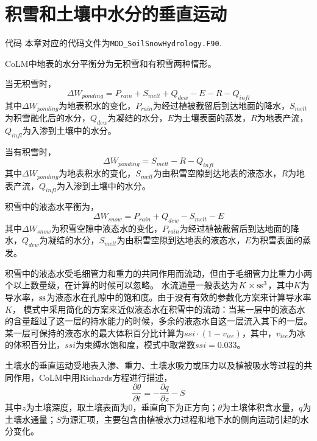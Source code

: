 \chapter{积雪和土壤中水分的垂直运动}\label{积雪和土壤中水分的垂直运动}

\begin{mymdframed}{代码}
本章对应的代码文件为\texttt{MOD\_SoilSnowHydrology.F90}.
\end{mymdframed}

CoLM中地表的水分平衡分为无积雪和有积雪两种情形。

当无积雪时，
\begin{equation}
\Delta W_{ponding} = P_{rain}+S_{melt}+Q_{dew}-E-R-Q_{infl}
\end{equation}
其中$\Delta W_{ponding}$为地表积水的变化，$P_{rain}$为经过植被截留后到达地面的降水，$S_{melt}$为积雪融化后的水分，$Q_{dew}$为凝结的水分，$E$为土壤表面的蒸发，$R$为地表产流，$Q_{infl}$为入渗到土壤中的水分。

当有积雪时，
\begin{equation}
\Delta W_{ponding} = S_{melt}-R-Q_{infl}
\end{equation}
其中$\Delta W_{ponding}$为地表积水的变化，$S_{melt}$为由积雪空隙到达地表的液态水，$R$为地表产流，$Q_{infl}$为入渗到土壤中的水分。

积雪中的液态水平衡为，
\begin{equation}
\Delta W_{snow} = P_{rain}+Q_{dew}-S_{melt}-E
\end{equation}
其中$\Delta W_{snow}$为积雪空隙中液态水的变化，$P_{rain}$为经过植被截留后到达地面的降水，$Q_{dew}$为凝结的水分，$S_{melt}$为由积雪空隙到达地表的液态水，$E$为积雪表面的蒸发。

积雪中的液态水受毛细管力和重力的共同作用而流动，但由于毛细管力比重力小两个以上数量级，在计算的时候可以忽略。
水流通量一般表达为$K\times{\rm ss}^3$，其中$K$为导水率，${\rm ss}$为液态水在孔隙中的饱和度。由于没有有效的参数化方案来计算导水率$K$，
模式中采用简化的方案来近似液态水在积雪中的流动：当某一层中的液态水的含量超过了这一层的持水能力的时候，多余的液态水自这一层流入其下的一层。
某一层可保持的液态水的最大体积百分比计算为$ssi\cdot\left(1-v_{ice}\right)$，其中，$v_{ice}$为冰的体积百分比，$ssi$为束缚水饱和度，模式中取常数$ssi=0.033$。

土壤水的垂直运动受地表入渗、重力、土壤水吸力或压力以及植被吸水等过程的共同作用，CoLM中用Richards方程进行描述，
\begin{equation}
\frac{\partial \theta}{\partial t}=-\frac{\partial q}{\partial z}-S
\end{equation}
其中$z$为土壤深度，取土壤表面为0，垂直向下为正方向；$\theta$为土壤体积含水量，$q$为土壤水通量；$S$为源汇项，主要包含由植被水力过程和地下水的侧向运动引起的水分变化。

